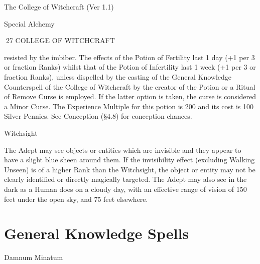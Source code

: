 \begin{Chapter}{The College of Witchcraft (Ver 1.1)}
\begin{talent}[T-2]{Special Alchemy }
\begin{effects}
27 COLLEGE OF WITCHCRAFT 

resisted by the imbiber. The effects of the Potion of 
Fertility  last  1  day  (+1  per  3  or  fraction  Ranks) 
whilst  that  of  the  Potion  of  Infertility  last  1  week 
(+1  per  3  or  fraction  Ranks),  unless  dispelled  by 
the casting of the General Knowledge Counterspell 
of  the  College  of  Witchcraft  by  the  creator  of  the 
Potion or a Ritual of Remove Curse is employed. If 
the latter option is taken, the curse is considered a 
Minor  Curse.  The  Experience  Multiple  for  this 
potion is 200 and its cost is 100 Silver Pennies. See 
Conception (§4.8) for conception chances. 

\end{effects}
\end{talent}

\begin{talent}[T-3]{Witchsight }

\begin{effects}
 The  Adept  may  see  objects  or  entities 
which are invisible and they appear to have a slight 
blue  sheen  around  them.  If  the  invisibility  effect 
(excluding  Walking  Unseen)  is  of  a  higher  Rank 
than the Witchsight, the object or entity may not be 
clearly  identified  or  directly  magically  targeted. 
The  Adept  may  also  see  in  the  dark  as  a  Human 
does  on  a  cloudy  day,  with  an  effective  range  of 
vision of 150 feet under the open sky, and 75 feet 
elsewhere. 


\end{effects}
\end{talent}

\section{General Knowledge Spells}

\begin{spell}[G-1]{Damnum Minatum }


\end{spell}
\end{Chapter}
